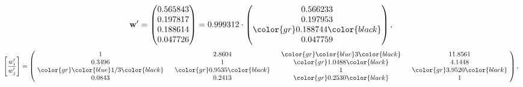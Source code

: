 \begin{example}
\begin{equation*}
\mathbf{w}^{\prime} =
\begin{pmatrix}
0.565843\\
0.197817\\
0.188614\\
0.047726
\end{pmatrix} =
0.999312\cdot
\begin{pmatrix}
0.566233\\
0.197953\\
\color{gr} 0.188744\color{black} \\
0.047759
\end{pmatrix},
\end{equation*}
\begin{equation*}
\left[ \frac{{w}^{\prime}_i}{{w}^{\prime}_j} \right] =
\begin{pmatrix}
$\,\,$ 1 $\,\,$ & $\,\,$2.8604$\,\,$ & $\,\,$\color{gr} \color{blue} 3\color{black} $\,\,$ & $\,\,$11.8561$\,\,$ \\
$\,\,$0.3496$\,\,$ & $\,\,$ 1 $\,\,$ & $\,\,$\color{gr} 1.0488\color{black} $\,\,$ & $\,\,$4.1448  $\,\,$ \\
$\,\,$\color{gr} \color{blue}  1/3\color{black} $\,\,$ & $\,\,$\color{gr} 0.9535\color{black} $\,\,$ & $\,\,$ 1 $\,\,$ & $\,\,$\color{gr} 3.9520\color{black}  $\,\,$ \\
$\,\,$0.0843$\,\,$ & $\,\,$0.2413$\,\,$ & $\,\,$\color{gr} 0.2530\color{black} $\,\,$ & $\,\,$ 1  $\,\,$ \\
\end{pmatrix},
\end{equation*}
\end{example}
\newpage
